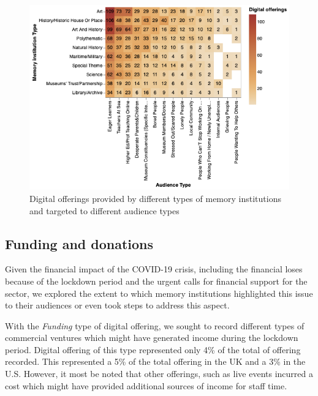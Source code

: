 \documentclass{egpubl}
\begin{document}
\begin{figure}[h]
  \centering
  \includegraphics[width=\linewidth]{images/audiencesboth.png}
  \caption{\label{fig:MTypeAudiences}
           Digital offerings provided by different types of memory institutions and targeted to different audience types}
\end{figure}



\subsection{Funding and donations}
\label{don}

Given the financial impact of the COVID-19 crisis, including the financial loses because of the lockdown period and the urgent calls for financial support for the sector, we explored the extent to which memory institutions highlighted this issue to their audiences or even took steps to address this aspect. 


With the \emph{Funding} type of digital offering, we sought to record different types of commercial ventures which might have generated income during the lockdown period. Digital offering of this type represented only 4\% of the total of offering recorded. This represented a 5\% of the total offering in the UK and a 3\% in the U.S. However, it most be noted that other offerings, such as live events incurred a cost which might have provided additional sources of income for staff time. 
\end{document}
